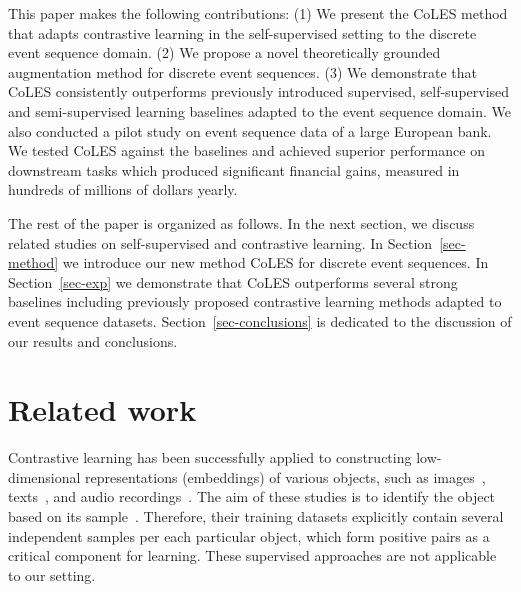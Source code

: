 \documentclass[sigconf]{acmart}
\begin{document}
This paper makes the following contributions: (1) We present the CoLES method that adapts contrastive learning in the self-supervised setting to the discrete event sequence domain. (2) We propose a novel theoretically grounded augmentation method for discrete event sequences. (3) We demonstrate that CoLES consistently outperforms previously introduced supervised, self-supervised and semi-supervised learning baselines adapted to the event sequence domain. We also conducted a pilot study on event sequence data 
of a large European bank. We tested CoLES against the baselines and achieved superior performance on downstream tasks which produced significant financial gains, measured in hundreds of millions of dollars yearly.

The rest of the paper is organized as follows. In the next section, we discuss related studies on self-supervised and contrastive learning. In Section~\ref{sec-method} we introduce our new method CoLES for discrete event sequences. In Section~\ref{sec-exp} we demonstrate that CoLES outperforms several strong baselines including previously proposed contrastive learning methods adapted to event sequence datasets. Section~\ref{sec-conclusions} is dedicated to the discussion of our results and conclusions.

\section{Related work} \label{sec-rel-work}

Contrastive learning has been successfully applied to constructing low-dimensional representations (embeddings) of various objects, such as images~\citep{Chopra2005LearningAS, Schroff2015FaceNetAU}, texts~\citep{Reimers2019SentenceBERTSE}, and audio recordings~\citep{Wan2018GeneralizedEL}.
The aim of these studies is to identify the object based on its sample~\citep{Schroff2015FaceNetAU, Hu2014DiscriminativeDM, Wan2018GeneralizedEL}. Therefore, their training datasets explicitly contain several independent samples per each particular object, which form positive pairs as a critical component for learning. These supervised approaches are not applicable to our setting.
\end{document}
